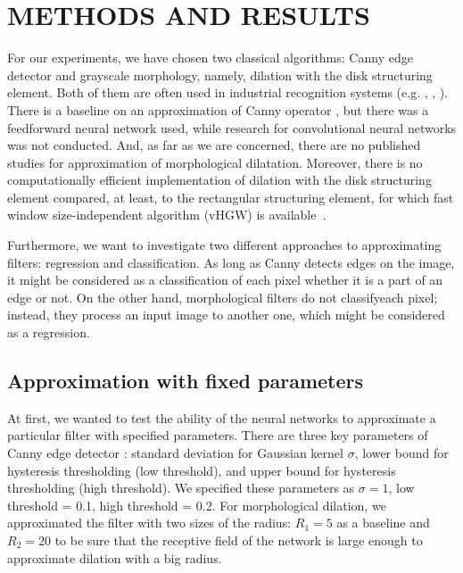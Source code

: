 \section*{\textbf{METHODS AND RESULTS}}

For our experiments, we have chosen two classical algorithms: Canny edge detector and grayscale morphology, namely, dilation with the disk structuring element. Both of them are often used in industrial recognition systems (e.g. \cite{panfilova2020using}, \cite{panfilova2021fast}, \cite{erlygin2021improvement}). There is a baseline on an approximation of Canny operator \citep{Fernandez11}, but there was a feedforward neural network used, while research for convolutional neural networks was not conducted. And, as far as we are concerned, there are no published studies for approximation of morphological dilatation. Moreover, there is no computationally efficient implementation of dilation with the disk structuring element compared, at least, to the rectangular structuring element, for which fast window size-independent algorithm (vHGW) is available~\citep{limonova2020fast}.

Furthermore, we want to investigate two different approaches to approximating filters: regression and classification. As long as Canny detects edges on the image, it might be considered as a classification of each pixel whether it is a part of an edge or not. On the other hand, morphological filters do not \glqq classify\grqq each pixel; instead, they process an input image to another one, which might be considered as a regression. 

\subsection*{\textbf{Approximation with fixed parameters}}


At first, we wanted to test the ability of the neural networks to approximate a particular filter with specified parameters. There are three key parameters of Canny edge detector \citep{CannyPaper}: standard deviation for Gaussian kernel $\sigma$, lower bound for hysteresis thresholding (low threshold), and upper bound for hysteresis thresholding (high threshold). We specified these parameters as $\sigma=1$, low threshold = 0.1, high threshold = 0.2. For morphological dilation, we approximated the filter with two sizes of the radius: $R_1 = 5$ as a baseline and $R_2 = 20$ to be sure that the receptive field of the network is large enough to approximate dilation with a big radius. 

